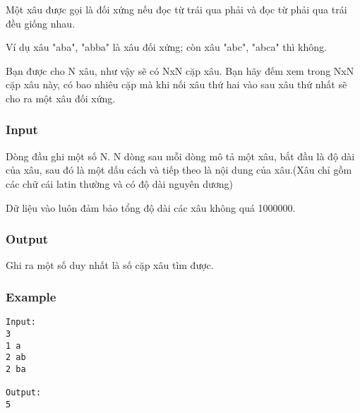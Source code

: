



   Một xâu được gọi là đối xứng nếu đọc từ trái qua phải và đọc từ phải qua trái đều giống nhau.   


   Ví dụ xâu "aba", "abba" là xâu đối xứng; còn xâu "abc", "abca" thì không.   


   Bạn được cho N xâu, như vậy sẽ có NxN cặp xâu. Bạn hãy đếm xem trong NxN cặp xâu này, có bao nhiêu cặp mà khi nối xâu thứ hai vào sau xâu thứ nhất sẽ cho ra một xâu đối xứng.  

\subsubsection{   Input  }

   Dòng đầu ghi một số N. N dòng sau mỗi dòng mô tả một xâu, bắt đầu là độ dài của xâu, sau đó là một dấu cách và tiếp theo là nội dung của xâu.(Xâu chỉ gồm các chữ cái latin thường và có độ dài nguyên dương)   


   Dữ liệu vào luôn đảm bảo tổng độ dài các xâu không quá 1000000.  

\subsubsection{   Output  }

   Ghi ra một số duy nhất là số cặp xâu tìm được.  

\subsubsection{   Example  }
\begin{verbatim}
Input:
3
1 a
2 ab
2 ba

Output:
5
\end{verbatim}
